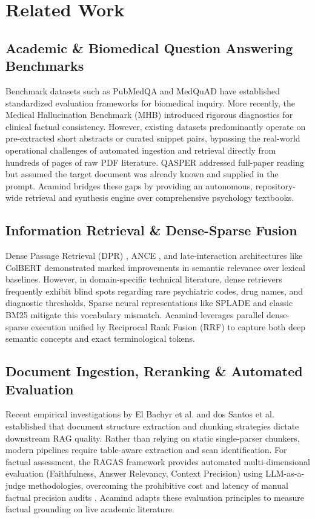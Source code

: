 \documentclass[10pt]{SPIIRAS_Proceedings}
\begin{document}
\section{Related Work}\label{sec:related_work}

\subsection{Academic \& Biomedical Question Answering Benchmarks}
Benchmark datasets such as PubMedQA \cite{jin2019pubmedqa} and MedQuAD \cite{abacha2019question} have established standardized evaluation frameworks for biomedical inquiry. More recently, the Medical Hallucination Benchmark (MHB) \cite{lu2026mhb} introduced rigorous diagnostics for clinical factual consistency. However, existing datasets predominantly operate on pre-extracted short abstracts or curated snippet pairs, bypassing the real-world operational challenges of automated ingestion and retrieval directly from hundreds of pages of raw PDF literature. QASPER \cite{dasigi2021dataset} addressed full-paper reading but assumed the target document was already known and supplied in the prompt. Acamind bridges these gaps by providing an autonomous, repository-wide retrieval and synthesis engine over comprehensive psychology textbooks.

\subsection{Information Retrieval \& Dense-Sparse Fusion}
Dense Passage Retrieval (DPR) \cite{karpukhin2020dense}, ANCE \cite{xiong2021approximate}, and late-interaction architectures like ColBERT \cite{khattab2020colbert} demonstrated marked improvements in semantic relevance over lexical baselines. However, in domain-specific technical literature, dense retrievers frequently exhibit blind spots regarding rare psychiatric codes, drug names, and diagnostic thresholds. Sparse neural representations like SPLADE \cite{formal2021splade} and classic BM25 mitigate this vocabulary mismatch. Acamind leverages parallel dense-sparse execution unified by Reciprocal Rank Fusion (RRF) \cite{cormack2009reciprocal} to capture both deep semantic concepts and exact terminological tokens.

\subsection{Document Ingestion, Reranking \& Automated Evaluation}
Recent empirical investigations by El Bachyr et al. \cite{elbachyr2024empirical} and dos Santos et al. \cite{santos2026pdf} established that document structure extraction and chunking strategies dictate downstream RAG quality. Rather than relying on static single-parser chunkers, modern pipelines require table-aware extraction and scan identification. For factual assessment, the RAGAS framework \cite{es2024ragas} provides automated multi-dimensional evaluation (Faithfulness, Answer Relevancy, Context Precision) using LLM-as-a-judge methodologies, overcoming the prohibitive cost and latency of manual factual precision audits \cite{min2023factscore}. Acamind adapts these evaluation principles to measure factual grounding on live academic literature.
\end{document}
